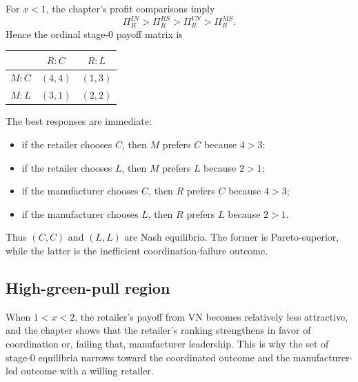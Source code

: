 For $x<1$, the chapter's profit comparisons imply
\begin{equation}
 \Pi_R^{IN}>\Pi_R^{RS}>\Pi_R^{VN}>\Pi_R^{MS}.
\end{equation}
Hence the ordinal stage-0 payoff matrix is
\begin{center}
\begin{tabular}{c|cc}
 & $R:C$ & $R:L$ \\\hline
$M:C$ & $(4,4)$ & $(1,3)$ \\
$M:L$ & $(3,1)$ & $(2,2)$
\end{tabular}
\end{center}
The best responses are immediate:
\begin{itemize}
 \item if the retailer chooses $C$, then $M$ prefers $C$ because $4>3$;
 \item if the retailer chooses $L$, then $M$ prefers $L$ because $2>1$;
 \item if the manufacturer chooses $C$, then $R$ prefers $C$ because $4>3$;
 \item if the manufacturer chooses $L$, then $R$ prefers $L$ because $2>1$.
\end{itemize}
Thus $(C,C)$ and $(L,L)$ are Nash equilibria. The former is Pareto-superior,
while the latter is the inefficient coordination-failure outcome.

\subsection{High-green-pull region}

When $1<x<2$, the retailer's payoff from VN becomes relatively less attractive,
and the chapter shows that the retailer's ranking strengthens in favor of
coordination or, failing that, manufacturer leadership. This is why the set of
stage-0 equilibria narrows toward the coordinated outcome and the
manufacturer-led outcome with a willing retailer.
